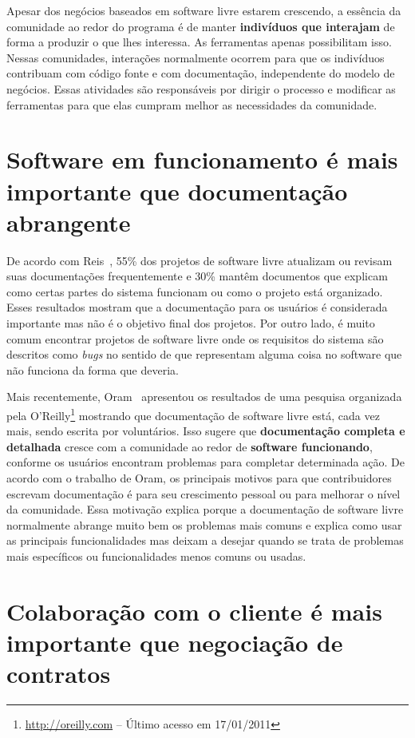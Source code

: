 Apesar dos negócios baseados em software livre estarem crescendo, a
essência da comunidade ao redor do programa é de manter
\textbf{indivíduos que interajam} de forma a produzir o que lhes
interessa. As ferramentas apenas possibilitam isso. Nessas
comunidades, interações normalmente ocorrem para que os indivíduos
contribuam com código fonte e com documentação, independente do modelo
de negócios. Essas atividades são responsáveis por dirigir o processo
e modificar as ferramentas para que elas cumpram melhor as
necessidades da comunidade.

\section{Software em funcionamento é mais importante que documentação
  abrangente}
\label{sec:second-princ}

De acordo com Reis~\cite{Reis2003}, 55\% dos projetos de software
livre atualizam ou revisam suas documentações frequentemente e 30\%
mantêm documentos que explicam como certas partes do sistema funcionam
ou como o projeto está organizado. Esses resultados mostram que a
documentação para os usuários é considerada importante mas não é o
objetivo final dos projetos. Por outro lado, é muito comum encontrar
projetos de software livre onde os requisitos do sistema são descritos
como \emph{bugs} no sentido de que representam alguma coisa no
software que não funciona da forma que deveria.

Mais recentemente, Oram~\cite{Oram2007} apresentou os resultados de
uma pesquisa organizada pela O'Reilly\footnote{\url{http://oreilly.com} --
  Último acesso em 17/01/2011} mostrando que documentação de software
livre está, cada vez mais, sendo escrita por voluntários. Isso sugere
que \textbf{documentação completa e detalhada} cresce com a comunidade
ao redor de \textbf{software funcionando}, conforme os usuários
encontram problemas para completar determinada ação. De acordo com o
trabalho de Oram, os principais motivos para que contribuidores
escrevam documentação é para seu crescimento pessoal ou para melhorar
o nível da comunidade. Essa motivação explica porque a documentação de
software livre normalmente abrange muito bem os problemas mais comuns
e explica como usar as principais funcionalidades mas deixam a desejar
quando se trata de problemas mais específicos ou funcionalidades menos
comuns ou usadas.

\section{Colaboração com o cliente é mais importante que negociação de
  contratos}
\label{sec:third-princ}

